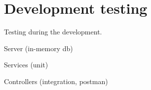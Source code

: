 
\section{Development testing}\label{sec:dev-testing}

Testing during the development.

Server (in-memory db)

Services (unit)

Controllers (integration, postman)

